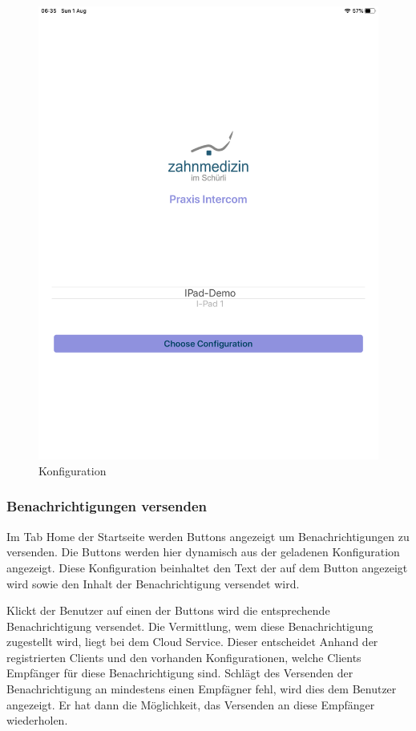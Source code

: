 \begin{figure}[h]
\begin{minipage}[b]{0.4\textwidth}
        \includegraphics[width=\textwidth]{graphics/screenshots/mobileclient/screenshot-select-config}
        \caption{Konfiguration}
    \end{minipage}
    \label{fig:MobileClient-Screens1}
\end{figure}

\clearpage

\subsubsection*{Benachrichtigungen versenden}

Im Tab Home der Startseite werden Buttons angezeigt um Benachrichtigungen zu versenden.
Die Buttons werden hier dynamisch aus der geladenen Konfiguration angezeigt.
Diese Konfiguration beinhaltet den Text der auf dem Button angezeigt wird sowie den Inhalt der Benachrichtigung versendet wird.

Klickt der Benutzer auf einen der Buttons wird die entsprechende Benachrichtigung versendet.
Die Vermittlung, wem diese Benachrichtigung zugestellt wird, liegt bei dem Cloud Service.
Dieser entscheidet Anhand der registrierten Clients und den vorhanden Konfigurationen, welche Clients Empfänger für diese Benachrichtigung sind.
Schlägt des Versenden der Benachrichtigung an mindestens einen Empfägner fehl, wird dies dem Benutzer angezeigt.
Er hat dann die Möglichkeit, das Versenden an diese Empfänger wiederholen.

